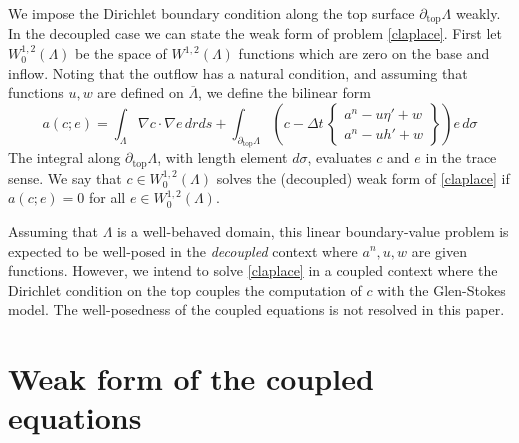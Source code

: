\documentclass[letterpaper,final,12pt,reqno]{amsart}
\newcommand{\grad}{\nabla}
\begin{document}
We impose the Dirichlet boundary condition along the top surface $\partial_{\text{top}} \Lambda$ weakly.  In the decoupled case we can state the weak form of problem \eqref{claplace}.  First let $W_0^{1,2}(\Lambda)$ be the space of $W^{1,2}(\Lambda)$ functions which are zero on the base and inflow.  Noting that the outflow has a natural condition, and assuming that functions $u,w$ are defined on $\overline\Lambda$, we define the bilinear form
\begin{equation}
a(c;e) = \int_\Lambda \grad c \cdot \grad e \,dr ds + \int_{\partial_{\text{top}} \Lambda} \left(c - \Delta t\,\begin{Bmatrix} a^n - u \eta' + w \\ a^n - u h' + w \end{Bmatrix}\right) e\,d\sigma \label{surfaceweakform}
\end{equation}
The integral along $\partial_{\text{top}} \Lambda$, with length element $d\sigma$, evaluates $c$ and $e$ in the trace sense.  We say that $c \in W_0^{1,2}(\Lambda)$ solves the (decoupled) weak form of \eqref{claplace} if $a(c;e)=0$ for all $e \in W_0^{1,2}(\Lambda)$.

Assuming that $\Lambda$ is a well-behaved domain, this linear boundary-value problem is expected to be well-posed in the \emph{decoupled} context where $a^n,u,w$ are given functions.  However, we intend to solve \eqref{claplace} in a coupled context where the Dirichlet condition on the top couples the computation of $c$ with the Glen-Stokes model.  The well-posedness of the coupled equations is not resolved in this paper.



\section{Weak form of the coupled equations} \label{sec:weakformcoupled}
\end{document}
